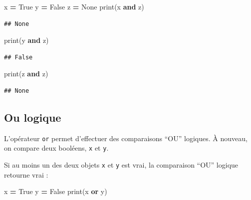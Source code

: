 \documentclass[12pt,]{book}
\newenvironment{Shaded}{\begin{snugshade}}{\end{snugshade}}
\newcommand{\KeywordTok}[1]{\textcolor[rgb]{0.13,0.29,0.53}{\textbf{#1}}}
\newcommand{\VariableTok}[1]{\textcolor[rgb]{0.00,0.00,0.00}{#1}}
\newcommand{\OperatorTok}[1]{\textcolor[rgb]{0.81,0.36,0.00}{\textbf{#1}}}
\newcommand{\BuiltInTok}[1]{#1}
\newcommand{\NormalTok}[1]{#1}
\numberwithin{equation}{section}
\numberwithin{countremarque}{section}
\begin{document}
\begin{Shaded}
\begin{Highlighting}[]
\NormalTok{x }\OperatorTok{=} \VariableTok{True}
\NormalTok{y }\OperatorTok{=} \VariableTok{False}
\NormalTok{z }\OperatorTok{=} \VariableTok{None}
\BuiltInTok{print}\NormalTok{(x }\KeywordTok{and}\NormalTok{ z)}
\end{Highlighting}
\end{Shaded}

\begin{lstlisting}
## None
\end{lstlisting}

\begin{Shaded}
\begin{Highlighting}[]
\BuiltInTok{print}\NormalTok{(y }\KeywordTok{and}\NormalTok{ z)}
\end{Highlighting}
\end{Shaded}

\begin{lstlisting}
## False
\end{lstlisting}

\begin{Shaded}
\begin{Highlighting}[]
\BuiltInTok{print}\NormalTok{(z }\KeywordTok{and}\NormalTok{ z)}
\end{Highlighting}
\end{Shaded}

\begin{lstlisting}
## None
\end{lstlisting}

\subsection{Ou logique}\label{ou-logique}

L'opérateur \texttt{or} permet d'effectuer des comparaisons ``OU''
logiques. À nouveau, on compare deux booléens, \texttt{x} et \texttt{y}.

Si au moins un des deux objets \texttt{x} et \texttt{y} est vrai, la
comparaison ``OU'' logique retourne vrai :

\begin{Shaded}
\begin{Highlighting}[]
\NormalTok{x }\OperatorTok{=} \VariableTok{True}
\NormalTok{y }\OperatorTok{=} \VariableTok{False}
\BuiltInTok{print}\NormalTok{(x }\KeywordTok{or}\NormalTok{ y)}
\end{Highlighting}
\end{Shaded}
\end{document}
